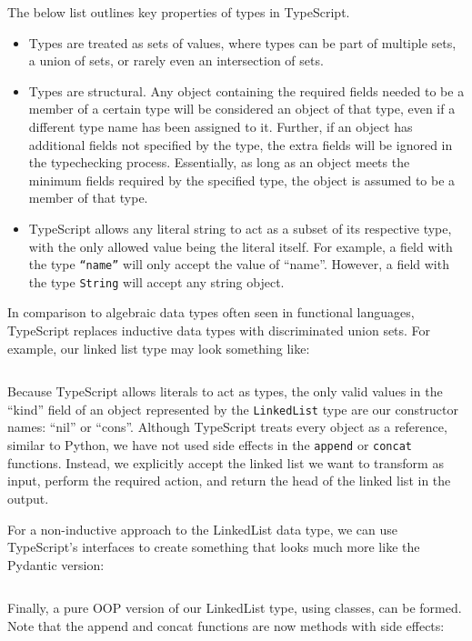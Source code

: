 \documentclass{article}
\begin{document}
The below list outlines key properties of types in TypeScript.
\begin{itemize}
    \item Types are treated as sets of values, where types can be part of multiple sets,
    a union of sets, or rarely even an intersection of sets.
    \item Types are structural. Any object containing the required fields needed to be a member of a certain type
    will be considered an object of that type, even if a different type name has been assigned to it.
    Further, if an object has additional fields not specified by the type,
    the extra fields will be ignored in the typechecking process. Essentially, as long as an object meets the minimum
    fields required by the specified type, the object is assumed to be a member of that type.
    \item TypeScript allows any literal string to act as a subset of its respective type,
    with the only allowed value being the literal itself.
    For example, a field with the type \texttt{``name''} will only accept the value of ``name''.
    However, a field with the type \texttt{String} will accept any string object.

\end{itemize}

In comparison to algebraic data types often seen in functional languages, TypeScript replaces inductive data types
with discriminated union sets. For example, our linked list type may look something like:
\inputminted{typescript}{linked_list/main.ts}

Because TypeScript allows literals to act as types, the only valid values in the ``kind'' field
of an object represented by the \texttt{LinkedList} type are our constructor names: ``nil'' or ``cons''.
Although TypeScript treats every object as a reference, similar to Python, we have not used side effects
in the \texttt{append} or \texttt{concat} functions. Instead, we explicitly accept the linked list we want to transform as
input, perform the required action, and return the head of the linked list in the output.

For a non-inductive approach to the LinkedList data type, we can use TypeScript's interfaces to create something that
looks much more like the Pydantic version:
\inputminted{typescript}{linked_list/main_interface.ts}

Finally, a pure OOP version of our LinkedList type, using classes, can be formed.
Note that the append and concat functions are now methods with side effects:
\inputminted{typescript}{linked_list/main_class.ts}
\end{document}
